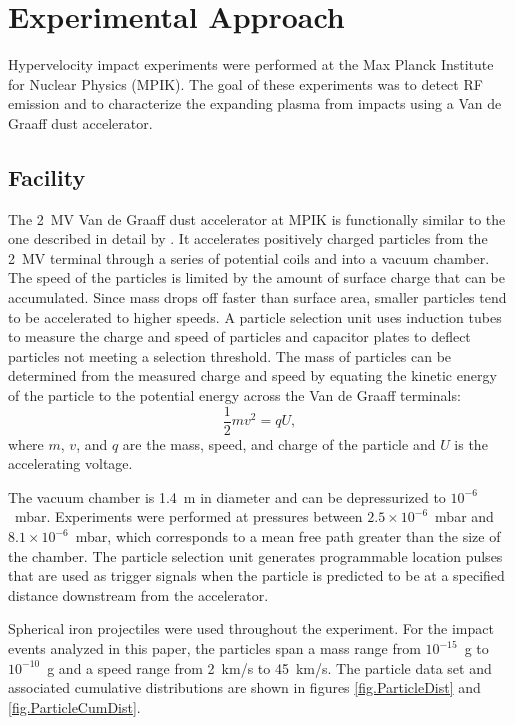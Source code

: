 \section{Experimental Approach}
\label{sec.ExperimentalApproach}
Hypervelocity impact experiments were performed at the Max Planck Institute for Nuclear Physics (MPIK).  The goal of these experiments was to detect RF emission and to characterize the expanding plasma from impacts using a Van de Graaff dust accelerator.

\subsection{Facility}
The 2~MV Van de Graaff dust accelerator at MPIK is functionally similar to the one described in detail by \citet{Burchell1999}.  It accelerates positively charged particles from the 2~MV terminal through a series of potential coils and into a vacuum chamber.  The speed of the particles is limited by the amount of surface charge that can be accumulated.  Since mass drops off faster than surface area, smaller particles tend to be accelerated to higher speeds.  A particle selection unit uses induction tubes to measure the charge and speed of particles and capacitor plates to deflect particles not meeting a selection threshold.  The mass of particles can be determined from the measured charge and speed by equating the kinetic energy of the particle to the potential energy across the Van de Graaff terminals:
\begin{equation}
\label{eq.VdGEnergyBalance}
\frac{1}{2}mv^2 = qU,
\end{equation}
where $m$, $v$, and $q$ are the mass, speed, and charge of the particle and $U$ is the accelerating voltage.

The vacuum chamber is 1.4~m in diameter and can be depressurized to $10^{-6}$~mbar.  Experiments were performed at pressures between $2.5\times10^{-6}$~mbar and $8.1\times10^{-6}$~mbar, which corresponds to a mean free path greater than the size of the chamber.  The particle selection unit generates programmable location pulses that are used as trigger signals when the particle is predicted to be at a specified distance downstream from the accelerator.

Spherical iron projectiles were used throughout the experiment.  For the impact events analyzed in this paper, the particles span a mass range from $10^{-15}$~g to $10^{-10}$~g and a speed range from 2~km/s to 45~km/s.  The particle data set and associated cumulative distributions are shown in figures \ref{fig.ParticleDist} and \ref{fig.ParticleCumDist}.

